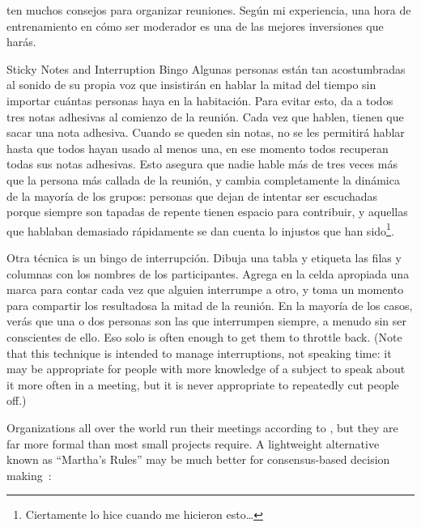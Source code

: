 \cite{Brow2007,Broo2016,Roge2018} ten muchos consejos para organizar reuniones.
Según mi experiencia,
una hora de entrenamiento en cómo ser moderador
es una de las mejores inversiones que harás.

\begin{aside}{Sticky Notes and Interruption Bingo}
  Algunas personas están tan acostumbradas al sonido de su propia voz
  que insistirán en hablar la mitad del tiempo
  sin importar cuántas personas haya en la habitación.
  Para evitar esto,
  da a todos tres notas adhesivas al comienzo de la reunión.
  Cada vez que hablen,
  tienen que sacar una nota adhesiva.
  Cuando se queden sin notas,
  no se les permitirá hablar hasta que todos hayan usado al menos una,
  en ese momento todos recuperan todas sus notas adhesivas.
  Esto asegura que nadie hable más de tres veces más que
  la persona más callada de la reunión,
  y cambia completamente la dinámica de la mayoría de los grupos:
  personas que dejan de intentar ser escuchadas porque siempre son tapadas
  de repente tienen espacio para contribuir,
  y aquellas que hablaban demasiado rápidamente se dan cuenta lo injustos que han sido\footnote{
    Ciertamente lo hice cuando me hicieron esto{\ldots}
  }.

  Otra técnica is un bingo de interrupción.
  Dibuja una tabla y etiqueta las filas y columnas con los nombres de los participantes.
  Agrega en la celda apropiada una marca para contar 
  cada vez que alguien interrumpe a otro,
  y toma un momento para compartir los resultadosa la mitad de la reunión.
  En la mayoría de los casos,
  verás que una o dos personas son las que interrumpen siempre,
  a menudo sin ser conscientes de ello.
  Eso solo is often enough to get them to throttle back.
  (Note that this technique is intended to manage interruptions,
  not speaking time:
  it may be appropriate for people with more knowledge of a subject
  to speak about it more often in a meeting,
  but it is never appropriate to repeatedly cut people off.)
\end{aside}


Organizations all over the world run their meetings according to
,
but they are far more formal than most small projects require.
A lightweight alternative known as ``Martha's Rules''
may be much better for consensus-based decision making~\cite{Mina1986}:

